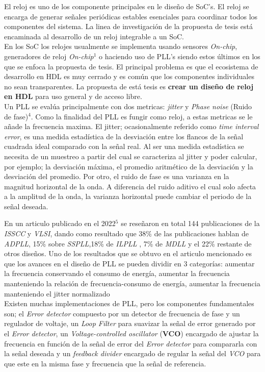 \documentclass[runningheads,a4paper]{llncs}
\begin{document}
    El reloj es uno de los componente principales en le diseño de SoC's. El reloj se encarga de generar señales periódicas estables esenciales para coordinar todos los componentes del sistema. La linea de investigación de la propuesta de tesis está encaminada al desarrollo de un reloj integrable a un SoC.\\

    En los SoC los relojes usualmente se implementa usando sensores \textit{On-chip}, generadores de reloj \textit{On-chip}${}^1$ o haciendo uso de PLL's siendo estos últimos en los que se enfoca la propuesta de tesis. El principal problema es que el ecosistema de desarrollo en HDL es muy cerrado y es común que los componentes individuales no sean transparentes. La propuesta de está tesis es \textbf{crear un diseño de reloj en HDL} para uso general y de acceso libre.\\

   Un PLL se evalúa principalmente con dos metricas: \textit{jitter} y \textit{Phase noise} (Ruido de fase)${}^4$. Como la finalidad del PLL es fungir como reloj, a estas metricas se le añade la frecuencia maxima.
    El jitter; ocasionalmente referido como \textit{time interval error}, es una medida estadística de la desviación entre los flancos de la señal cuadrada ideal comparado con la señal real. Al ser una medida estadística se necesita de un muestreo a partir del cual se caracteriza al jitter y poder calcular, por ejemplo; la desviación máxima, el promedio aritmético de la desviación y la desviación del promedio. Por otro, el ruido de fase es una varianza en la magnitud horizontal de la onda. A diferencia del ruido aditivo el cual solo afecta a la amplitud de la onda, la varianza horizontal puede cambiar el periodo de la señal deseada.

    En un articulo publicado en el 2022${}^5$ se reseñaron en total 144 publicaciones de la \textit{ISSCC} y \textit{VLSI}, dando como resultado que 38\% de las publicaciones hablan de \textit{ADPLL}, 15\% sobre \textit{SSPLL},18\% de \textit{ILPLL} , 7\% de \textit{MDLL} y el 22\% restante de otros diseños.
    Uno de los resultados que se obtuvo en el articulo mencionado es que los avances en el diseño de PLL se pueden dividir en 3 categorías: aumentar la frecuencia conservando el consumo de energía, aumentar la frecuencia manteniendo la relación de frecuencia-consumo de energía, aumentar la frecuencia manteniendo el jitter normalizado\\

    Existen muchas implementaciones de PLL, pero los componentes fundamentales son; el \textit{Error detector} compuesto por un detector de frecuencia de fase y un regulador de voltaje, un \textit{Loop Filter} para suavizar la señal de error generado por el \textit{Error detector}, un \textit{Voltage-controlled oscillator} (\textbf{VCO}) encargado de ajustar la frecuencia en función de la señal de error del \textit{Error detector} para compararla con la señal deseada y un \textit{feedback divider} encargado de regular la señal del \textit{VCO} para que este en la misma fase y frecuencia que la señal de referencia.\\ 
\end{document}
